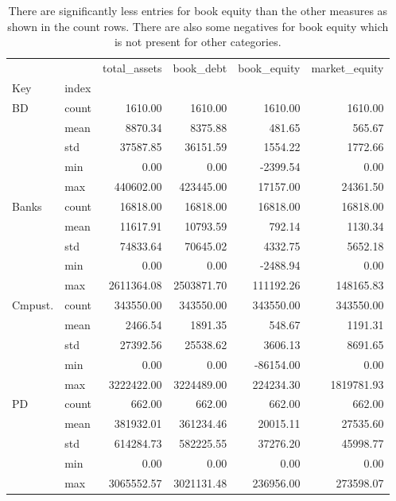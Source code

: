 \begin{table}
\caption{There are significantly less entries for book equity than the other measures as shown in the count rows. There are also some negatives for book equity which is not present for other categories. }
\label{tab:Table 2.1}
\begin{tabular}{llrrrr}
\toprule
 &  & total_assets & book_debt & book_equity & market_equity \\
Key & index &  &  &  &  \\
\midrule
{BD} & count & 1610.00 & 1610.00 & 1610.00 & 1610.00 \\
 & mean & 8870.34 & 8375.88 & 481.65 & 565.67 \\
 & std & 37587.85 & 36151.59 & 1554.22 & 1772.66 \\
 & min & 0.00 & 0.00 & -2399.54 & 0.00 \\
 & max & 440602.00 & 423445.00 & 17157.00 & 24361.50 \\
\cline{1-6}
{Banks} & count & 16818.00 & 16818.00 & 16818.00 & 16818.00 \\
 & mean & 11617.91 & 10793.59 & 792.14 & 1130.34 \\
 & std & 74833.64 & 70645.02 & 4332.75 & 5652.18 \\
 & min & 0.00 & 0.00 & -2488.94 & 0.00 \\
 & max & 2611364.08 & 2503871.70 & 111192.26 & 148165.83 \\
\cline{1-6}
{Cmpust.} & count & 343550.00 & 343550.00 & 343550.00 & 343550.00 \\
 & mean & 2466.54 & 1891.35 & 548.67 & 1191.31 \\
 & std & 27392.56 & 25538.62 & 3606.13 & 8691.65 \\
 & min & 0.00 & 0.00 & -86154.00 & 0.00 \\
 & max & 3222422.00 & 3224489.00 & 224234.30 & 1819781.93 \\
\cline{1-6}
{PD} & count & 662.00 & 662.00 & 662.00 & 662.00 \\
 & mean & 381932.01 & 361234.46 & 20015.11 & 27535.60 \\
 & std & 614284.73 & 582225.55 & 37276.20 & 45998.77 \\
 & min & 0.00 & 0.00 & 0.00 & 0.00 \\
 & max & 3065552.57 & 3021131.48 & 236956.00 & 273598.07 \\
\cline{1-6}
\bottomrule
\end{tabular}
\end{table}
